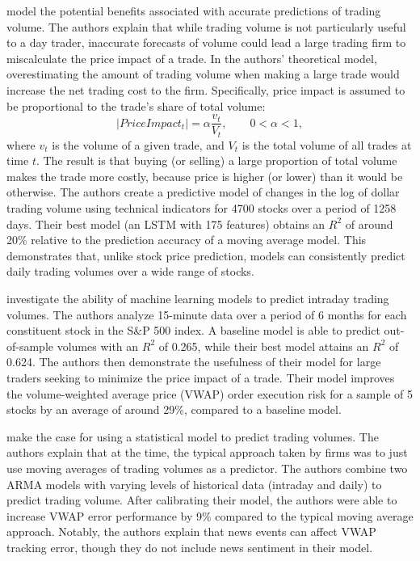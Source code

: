 \documentclass[12pt]{article}
\begin{document}
\textcite{goyenko2024trading} model the potential benefits associated with accurate predictions of trading volume. The authors explain that while trading volume is not particularly useful to a day trader, inaccurate forecasts of volume could lead a large trading firm to miscalculate the price impact of a trade. In the authors' theoretical model, overestimating the amount of trading volume when making a large trade would increase the net trading cost to the firm. Specifically, price impact is assumed to be proportional to the trade's share of total volume:
\begin{equation}
    |Price Impact_{t}| = \alpha\frac{v_{t}}{V_{t}}, \qquad 0< \alpha < 1,
\end{equation}
where $v_{t}$ is the volume of a given trade, and $V_{t}$ is the total volume of all trades at time $t$. The result is that buying (or selling) a large proportion of total volume makes the trade more costly, because price is higher (or lower) than it would be otherwise. The authors create a predictive model of changes in the log of dollar trading volume using technical indicators for 4700 stocks over a period of 1258 days. Their best model (an LSTM with 175 features) obtains an $R^2$ of around 20\% relative to the prediction accuracy of a moving average model. This demonstrates that, unlike stock price prediction, models can consistently predict daily trading volumes over a wide range of stocks.

\textcite{cucuringu2025forecasting} investigate the ability of machine learning models to predict intraday trading volumes. The authors analyze 15-minute data over a period of 6 months for each constituent stock in the S\&P 500 index. A baseline model is able to predict out-of-sample volumes with an $R^2$ of 0.265, while their best model attains an $R^2$ of 0.624. The authors then demonstrate the usefulness of their model for large traders seeking to minimize the price impact of a trade. Their model improves the volume-weighted average price (VWAP) order execution risk for a sample of 5 stocks by an average of around 29\%, compared to a baseline model.

\textcite{satish2014predicting} make the case for using a statistical model to predict trading volumes. The authors explain that at the time,  the typical approach taken by firms was to just use moving averages of trading volumes as a predictor. The authors combine two ARMA models with varying levels of historical data (intraday and daily) to predict trading volume. After calibrating their model, the authors were able to increase VWAP error performance by 9\% compared to the typical moving average approach. Notably, the authors explain that news events can affect VWAP tracking error, though they do not include news sentiment in their model.
\end{document}
